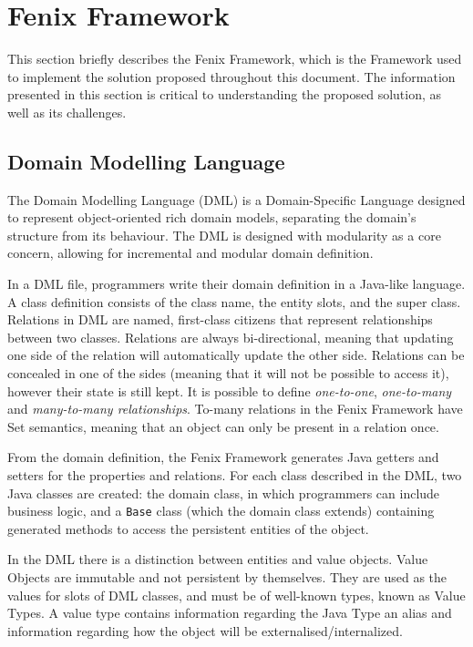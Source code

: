 \documentclass{llncs}
\begin{document}

\section{Fenix Framework}
\label{chap:ff}

This section briefly describes the Fenix Framework, which is the
Framework used to implement the solution proposed throughout this
document. The information presented in this section is critical to
understanding the proposed solution, as well as its challenges.

\subsection{Domain Modelling Language}
\label{sec:dml}

The Domain Modelling Language (DML) is a Domain-Specific Language
designed to represent object-oriented rich domain models, separating
the domain's structure from its behaviour. The DML is designed with
modularity as a core concern, allowing for incremental and modular
domain definition.

In a DML file, programmers write their domain definition in a
Java-like language. A class definition consists of the class name, the
entity slots, and the super class. Relations in DML are named,
first-class citizens that represent relationships between two
classes. Relations are always bi-directional, meaning that updating
one side of the relation will automatically update the other
side. Relations can be concealed in one of the sides (meaning that it
will not be possible to access it), however their state is still kept.
It is possible to define {\it one-to-one}, {\it one-to-many} and {\it
  many-to-many relationships}. To-many relations in the Fenix
Framework have Set semantics, meaning that an object can only be
present in a relation once.

From the domain definition, the Fenix Framework generates Java getters
and setters for the properties and relations. For each class described
in the DML, two Java classes are created: the domain class, in which
programmers can include business logic, and a \texttt{Base} class
(which the domain class extends) containing generated methods to
access the persistent entities of the object.

In the DML there is a distinction between entities and value
objects. Value Objects are immutable and not persistent by
themselves. They are used as the values for slots of DML classes, and
must be of well-known types, known as Value Types. A value type
contains information regarding the Java Type an alias and information
regarding how the object will be externalised/internalized.
\end{document}
